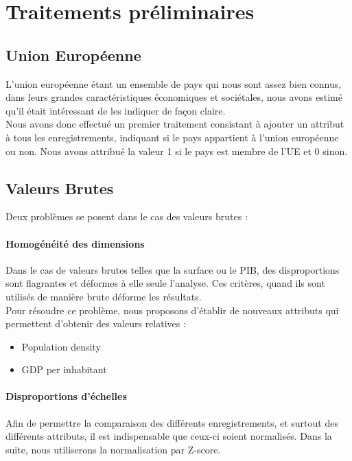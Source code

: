 \section{Traitements préliminaires}

\subsection{Union Européenne}
L'union européenne étant un ensemble de pays qui nous sont assez bien connus, dans leurs grandes caractéristiques économiques et sociétales, nous avons estimé qu'il était intéressant de les indiquer de façon claire.\\
Nous avons donc effectué un premier traitement consistant à ajouter un attribut à tous les enregistrements, indiquant si le pays appartient à l'union européenne ou non. Nous avons attribué la valeur 1 si le pays est membre de l'UE et 0 sinon. \\

\subsection{Valeurs Brutes}
Deux problèmes se posent dans le cas des valeurs brutes : 
\paragraph{Homogénéité des dimensions} Dans le cas de valeurs brutes telles que la surface ou le PIB, des disproportions sont flagrantes et déformes à elle seule l'analyse. Ces critères, quand ils sont utilisés de manière brute déforme les résultats.\\
Pour résoudre ce problème, nous proposons d'établir de nouveaux attributs qui permettent d'obtenir des valeurs relatives : 
\begin{itemize}
	\item Population density 
	\item GDP per inhabitant
\end{itemize}

\paragraph{Disproportions d'échelles}
Afin de permettre la comparaison des différents enregistrements, et surtout des différents attributs, il est indispensable que ceux-ci soient normalisés.
Dans la suite, nous utiliserons la normalisation par Z-score.







